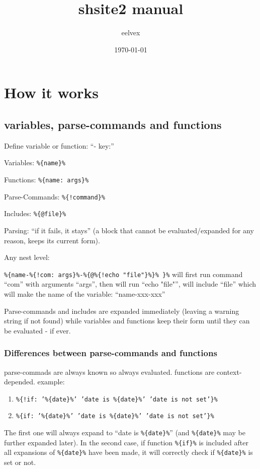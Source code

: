 \documentclass{memoir}
\title{shsite2 manual}
\author{eelvex}
\date{\today}
\newcommand{\var}[1]{\texttt{\%\{#1\}\%}}
\begin{document}
\begin{titlingpage}
\maketitle
\end{titlingpage}
\tableofcontents

\chapter{How it works} %

	\section{variables, parse-commands and functions} %

		Define variable or function: ``- key:''

		Variables: \var{name}

		Functions: \var{name: args}

		Parse-Commands: \var{!command}

		Includes:  \var{@file}

		Parsing: ``if it fails, it stays'' (a block that cannot be evaluated/expanded for any reason, keeps its current form).

		Any nest level:

		\var{name-\var{!com: args}-\var{@\var{!echo "file"}} }
		will first run command ``com'' with arguments ``args'', then will run ``echo "file"'', will include ``file''
		which will make the name of the variable: ``name-xxx-xxx''

		Parse-commands and includes are expanded immediately (leaving a warning
		string if not found) while variables and functions keep their form
		until they can be evaluated - if ever.

		\subsection{Differences between parse-commands and functions} %
			parse-commads are always known so always evaluated. functions are context-depended.
			example: 
			\begin{enumerate}
			\item \var{!if: '\var{date}' 'date is \var{date}' 'date is not set'}\\
			\item \var{if: '\var{date}' 'date is \var{date}' 'date is not set'}
			\end{enumerate}
			The first one will always expand to ``date is \var{date}'' (and \var{date} may be further expanded later).
			In the second case, if function \var{if} is included after all expansions of \var{date} have been made, it will 
			correctly check if \var{date} is set or not.
\end{document}
